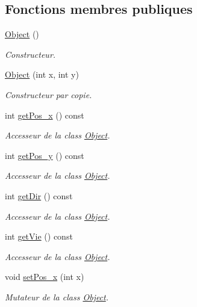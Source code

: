 \subsection*{Fonctions membres publiques}
\begin{DoxyCompactItemize}
\item 
\hyperlink{class_object_a40860402e64d8008fb42329df7097cdb}{Object} ()
\begin{DoxyCompactList}\small\item\em Constructeur. \end{DoxyCompactList}\item 
\hyperlink{class_object_abdc77f1bc660f185ecf2fc1a628ea6eb}{Object} (int x, int y)
\begin{DoxyCompactList}\small\item\em Constructeur par copie. \end{DoxyCompactList}\item 
int \hyperlink{class_object_ad7dcd5f1f45ce373c6e57bae5d1aebec}{get\+Pos\+\_\+x} () const
\begin{DoxyCompactList}\small\item\em Accesseur de la class \hyperlink{class_object}{Object}. \end{DoxyCompactList}\item 
int \hyperlink{class_object_a74b891ac92f211e8d8f9fd09d7822ec4}{get\+Pos\+\_\+y} () const
\begin{DoxyCompactList}\small\item\em Accesseur de la class \hyperlink{class_object}{Object}. \end{DoxyCompactList}\item 
int \hyperlink{class_object_ac2053fa5af98fc92a4c990946a926aa5}{get\+Dir} () const
\begin{DoxyCompactList}\small\item\em Accesseur de la class \hyperlink{class_object}{Object}. \end{DoxyCompactList}\item 
int \hyperlink{class_object_a334099b7bd5ecf8515a1e8f3d96ebba9}{get\+Vie} () const
\begin{DoxyCompactList}\small\item\em Accesseur de la class \hyperlink{class_object}{Object}. \end{DoxyCompactList}\item 
void \hyperlink{class_object_a65c8e1794d02320269340d22084d0807}{set\+Pos\+\_\+x} (int x)
\begin{DoxyCompactList}\small\item\em Mutateur de la class \hyperlink{class_object}{Object}. \end{DoxyCompactList}\item 

\end{DoxyCompactItemize}
